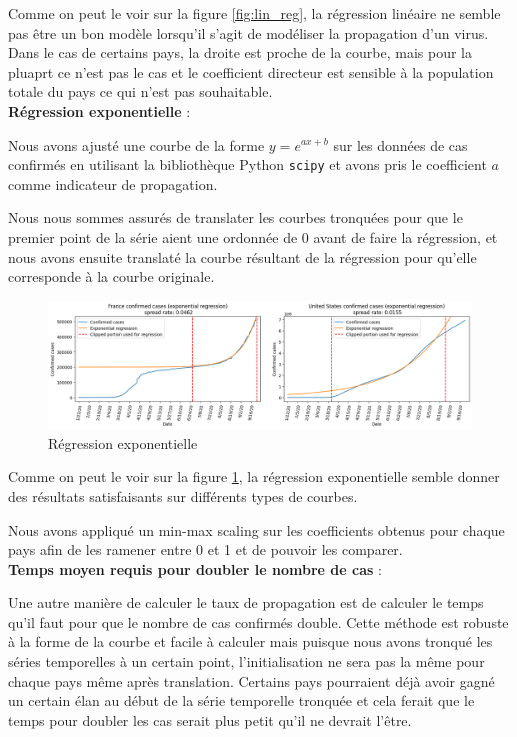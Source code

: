 \documentclass[12pt]{iEEEtran}
\begin{document}
Comme on peut le voir sur la figure \ref{fig:lin_reg}, la régression linéaire ne semble pas être un
bon modèle lorsqu'il s'agit de modéliser la propagation d'un virus. Dans le cas de certains pays, la
droite est proche de la courbe, mais pour la pluaprt ce n'est pas le cas et le coefficient directeur
est sensible à la population totale du pays ce qui n'est pas souhaitable.
\\

\noindent\textbf{Régression exponentielle} :

Nous avons ajusté une courbe de la forme $y = e^{ax+b}$ sur les données de cas confirmés en utilisant
la bibliothèque Python \texttt{scipy} et avons pris le coefficient $a$ comme indicateur de propagation.

Nous nous sommes assurés de translater les courbes tronquées pour que le premier point de la série
aient une ordonnée de 0 avant de faire la régression, et nous avons ensuite translaté la courbe
résultant de la régression pour qu'elle corresponde à la courbe originale.

\begin{figure}[h]
    \centering
    \includegraphics[width=\columnwidth]{img/exp_reg.png}
    \caption{Régression exponentielle}

    \label{fig:exp_reg}
\end{figure}

Comme on peut le voir sur la figure \ref{fig:exp_reg}, la régression exponentielle semble donner
des résultats satisfaisants sur différents types de courbes.

Nous avons appliqué un min-max scaling sur les coefficients obtenus pour chaque pays afin de les
ramener entre 0 et 1 et de pouvoir les comparer.
\\

\noindent\textbf{Temps moyen requis pour doubler le nombre de cas} :

Une autre manière de calculer le taux de propagation est de calculer le temps qu'il faut pour que le nombre
de cas confirmés double. Cette méthode est robuste à la forme de la courbe et facile à calculer mais puisque
nous avons tronqué les séries temporelles à un certain point, l'initialisation ne sera pas la même pour chaque
pays même après translation. Certains pays pourraient déjà avoir gagné un certain élan au début de la série
temporelle tronquée et cela ferait que le temps pour doubler les cas serait plus petit qu'il ne devrait l'être.
\end{document}
